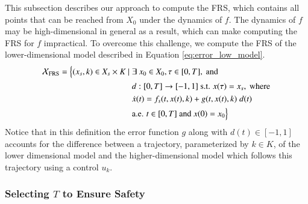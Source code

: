 This subsection describes our approach to compute the FRS, which contains all points that can be reached from $X_0$ under the dynamics of $f$. 
The dynamics of $f$ may be high-dimensional in general as a result, which can make computing the FRS for $f$ impractical.
To overcome this challenge, we compute the FRS of the lower-dimensional model described in Equation \eqref{eq:error_low_model}.
\begin{equation}
\begin{aligned}
\mathcal{X}_\text{FRS} = \Big\{(x_s,k) \in X_s \times K \ | \; &  \exists~ x_0 \in X_0, \tau \in [0,T], \text{ and } \\ 
& d: [0,T] \to [-1,1] \text{ s.t. } x(\tau) = x_s, \text{ where} \\
& \dot{x}(t) = f_s(t,x(t),k) + g(t,x(t),k)\; d(t)\\
& \text{a.e. } t \in [0,T] \text{ and } x(0) = x_0 \Big\}
\end{aligned}
\end{equation}
Notice that in this definition the error function $g$ along with $d(t) \in [-1,1]$ accounts for the difference between a trajectory, parameterized by $k \in K$, of the lower dimensional model and the higher-dimensional model which follows this trajectory using a control $u_k$.


\subsubsection{Selecting $T$ to Ensure Safety}

